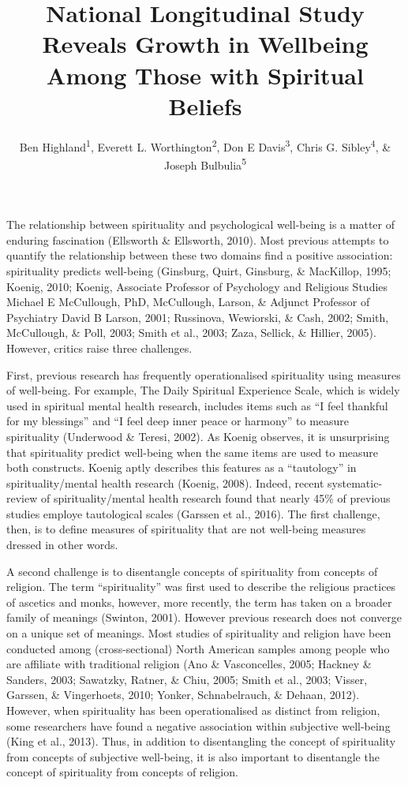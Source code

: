 \documentclass[
  english,
  man]{apa6}
\title{National Longitudinal Study Reveals Growth in Wellbeing Among Those with Spiritual Beliefs}
\author{Ben Highland\textsuperscript{1}, Everett L. Worthington\textsuperscript{2}, Don E Davis\textsuperscript{3}, Chris G. Sibley\textsuperscript{4}, \& Joseph Bulbulia\textsuperscript{5}}
\date{}
\affiliation{\phantom{0}}
\begin{document}
\maketitle

The relationship between spirituality and psychological well-being is a matter of enduring fascination (Ellsworth \& Ellsworth, 2010). Most previous attempts to quantify the relationship between these two domains find a positive association: spirituality predicts well-being (Ginsburg, Quirt, Ginsburg, \& MacKillop, 1995; Koenig, 2010; Koenig, Associate Professor of Psychology and Religious Studies Michael E McCullough, PhD, McCullough, Larson, \& Adjunct Professor of Psychiatry David B Larson, 2001; Russinova, Wewiorski, \& Cash, 2002; Smith, McCullough, \& Poll, 2003; Smith et al., 2003; Zaza, Sellick, \& Hillier, 2005). However, critics raise three challenges.

First, previous research has frequently operationalised spirituality using measures of well-being. For example, The Daily Spiritual Experience Scale, which is widely used in spiritual mental health research, includes items such as \enquote{I feel thankful for my blessings} and \enquote{I feel deep inner peace or harmony} to measure spirituality (Underwood \& Teresi, 2002). As Koenig observes, it is unsurprising that spirituality predict well-being when the same items are used to measure both constructs. Koenig aptly describes this features as a \enquote{tautology} in spirituality/mental health research (Koenig, 2008). Indeed, recent systematic-review of spirituality/mental health research found that nearly 45\% of previous studies employe tautological scales (Garssen et al., 2016). The first challenge, then, is to define measures of spirituality that are not well-being measures dressed in other words.

A second challenge is to disentangle concepts of spirituality from concepts of religion. The term \enquote{spirituality} was first used to describe the religious practices of ascetics and monks, however, more recently, the term has taken on a broader family of meanings (Swinton, 2001). However previous research does not converge on a unique set of meanings. Most studies of spirituality and religion have been conducted among (cross-sectional) North American samples among people who are affiliate with traditional religion (Ano \& Vasconcelles, 2005; Hackney \& Sanders, 2003; Sawatzky, Ratner, \& Chiu, 2005; Smith et al., 2003; Visser, Garssen, \& Vingerhoets, 2010; Yonker, Schnabelrauch, \& Dehaan, 2012). However, when spirituality has been operationalised as distinct from religion, some researchers have found a negative association within subjective well-being (King et al., 2013). Thus, in addition to disentangling the concept of spirituality from concepts of subjective well-being, it is also important to disentangle the concept of spirituality from concepts of religion.
\end{document}
